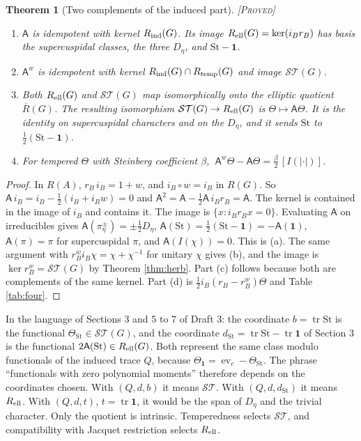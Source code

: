 \documentclass[12pt,letterpaper]{amsart}
\numberwithin{equation}{section}
\newtheorem{theorem}{Theorem}[section]
\theoremstyle{definition}
\theoremstyle{remark}
\newcommand{\St}{\mathrm{St}}
\newcommand{\triv}{\mathbf 1}
\newcommand{\tr}{\operatorname{tr}}
\newcommand{\ST}{\mathcal{ST}}
\newcommand{\ev}{\operatorname{ev}}
\newcommand{\status}[1]{\textup{[\textsc{#1}]}}
\begin{document}
\begin{theorem}[Two complements of the induced part]\label{thm:twosplit}\status{Proved}
\begin{enumerate}[label=(\alph*),leftmargin=*]
\item $\mathsf A$ is idempotent with kernel $R_{\rm ind}(G)$. Its image $R_{\rm ell}(G)=\ker(i_Br_B)$ has basis the supercuspidal classes, the three $D_\eta$, and $\St-\triv$.
\item $\mathsf A^w$ is idempotent with kernel $R_{\rm ind}(G)\cap R_{\rm temp}(G)$ and image $\ST(G)$.
\item Both $R_{\rm ell}(G)$ and $\ST(G)$ map isomorphically onto the elliptic quotient $\overline R(G)$. The resulting isomorphism $\ST(G)\to R_{\rm ell}(G)$ is $\Theta\mapsto\mathsf A\Theta$. It is the identity on supercuspidal characters and on the $D_\eta$, and it sends $\St$ to $\tfrac12(\St-\triv)$.
\item For tempered $\Theta$ with Steinberg coefficient $\beta$, $\ \mathsf A^w\Theta-\mathsf A\Theta=\tfrac\beta2\,[I(|\cdot|)]$.
\end{enumerate}
\end{theorem}
\begin{proof}
In $R(A)$, $r_B\,i_B=1+w$, and $i_B\circ w=i_B$ in $R(G)$. So $\mathsf A\,i_B=i_B-\tfrac12(i_B+i_Bw)=0$ and $\mathsf A^2=\mathsf A-\tfrac12\mathsf A\,i_Br_B=\mathsf A$. The kernel is contained in the image of $i_B$ and contains it. The image is $\{x:i_Br_Bx=0\}$. Evaluating $\mathsf A$ on irreducibles gives $\mathsf A(\pi_\eta^\pm)=\pm\tfrac12D_\eta$, $\mathsf A(\St)=\tfrac12(\St-\triv)=-\mathsf A(\triv)$, $\mathsf A(\pi)=\pi$ for supercuspidal $\pi$, and $\mathsf A(I(\chi))=0$. This is (a). The same argument with $r_B^wi_B\chi=\chi+\chi^{-1}$ for unitary $\chi$ gives (b), and the image is $\ker r_B^w=\ST(G)$ by Theorem \ref{thm:herb}. Part (c) follows because both are complements of the same kernel. Part (d) is $\tfrac12i_B(r_B-r_B^w)\Theta$ and Table \ref{tab:four}.
\end{proof}

In the language of Sections 3 and 5 to 7 of Draft 3: the coordinate $b=\tr\St$ is the functional $\Theta_{\St}\in\ST(G)$, and the coordinate $d_{\St}=\tr\St-\tr\triv$ of Section 3 is the functional $2\mathsf A(\St)\in R_{\rm ell}(G)$. Both represent the same class modulo functionals of the induced trace $Q$, because $\Theta_{\triv}=\ev_c-\Theta_{\St}$. The phrase ``functionals with zero polynomial moments'' therefore depends on the coordinates chosen. With $(Q,d,b)$ it means $\ST$. With $(Q,d,d_{\St})$ it means $R_{\rm ell}$. With $(Q,d,t)$, $t=\tr\triv$, it would be the span of $D_\eta$ and the trivial character. Only the quotient is intrinsic. Temperedness selects $\ST$, and compatibility with Jacquet restriction selects $R_{\rm ell}$.
\end{document}
